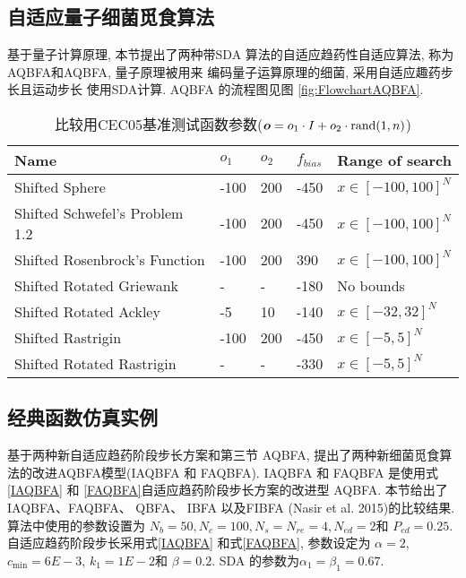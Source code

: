 \subsection{自适应量子细菌觅食算法}
基于量子计算原理, 本节提出了两种带SDA 算法的自适应趋药性自适应算法, 称为 AQBFA和AQBFA, 量子原理被用来 编码量子运算原理的细菌, 采用自适应趣药步长且运动步长 使用SDA计算.  AQBFA 的流程图见图 \ref{fig:FlowchartAQBFA}.
\begin{table}[tb]
\begin{center}
\caption{比较用CEC05基准测试函数参数($\bm o=o_1 \cdot I+o_2\cdot \textup{rand}(1,n)$)}
    \vspace{0.5em}\centering
\begin{tabularx}{0.9\textwidth}{p{6.0cm} p{1.05cm}p{0.75cm}p{1.05cm}p{4.2cm}}
\hline
Name &  $o_1$&  $o_2$&   $f_{bias}$& Range of search\\
\hline
Shifted Sphere &  -100&  200&  -450 &  $x\in [-100,100]^N$\\
Shifted Schwefel's Problem 1.2 &  -100&  200&  -450 &   $x\in [-100,100]^N$\\
Shifted Rosenbrock's Function &  -100&  200&  390 &   $x\in [-100,100]^N$\\
Shifted Rotated Griewank &  -&  -&  -180 &  No bounds\\
Shifted Rotated Ackley&  -5&  10&  -140 &  $x\in [-32,32]^N$\\
Shifted Rastrigin &  -100&  200&  -450 &  $x\in [-5,5]^N$\\
Shifted Rotated  Rastrigin&  -&  -&  -330 &  $x\in [-5,5]^N$\\
\hline
\end{tabularx}
\label{Tab:CEC05ofbias}
\end{center}
\end{table}
\subsection{经典函数仿真实例}
基于两种新自适应趋药阶段步长方案和第三节 AQBFA, 提出了两种新细菌觅食算法的改进AQBFA模型(IAQBFA 和 FAQBFA). IAQBFA 和 FAQBFA 是使用式\eqref{IAQBFA} 和 \eqref{FAQBFA}自适应趋药阶段步长方案的改进型 AQBFA. 本节给出了 IAQBFA、FAQBFA、 QBFA、 IBFA 以及FIBFA (Nasir et al. 2015)的比较结果. 算法中使用的参数设置为 $N_b=50, N_c=100, N_s=N_{re}=4, N_{ed}=2$和 $P_{ed}=0.25$. 自适应趋药阶段步长采用式\eqref{IAQBFA} 和式\eqref{FAQBFA}, 参数设定为 $\alpha=2$, $c_{\min}=6E-3$, $k_1=1E-2$和 $\beta=0.2$. SDA 的参数为$\alpha_1=\beta_1=0.67$.
